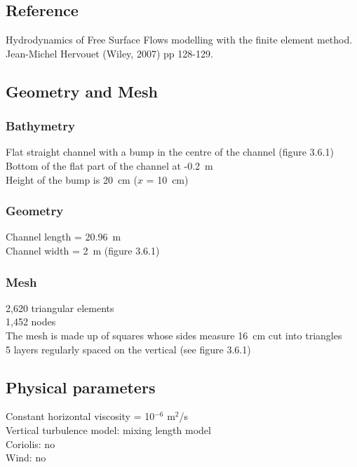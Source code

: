 \subsection{Reference}
%
Hydrodynamics of Free Surface Flows modelling with the finite element
method. Jean-Michel Hervouet (Wiley, 2007) pp 128-129.
%
%
%
\subsection{Geometry and Mesh}
%
\subsubsection{Bathymetry}
%
Flat straight channel with a bump in the centre of the channel
(figure 3.6.1)\\
Bottom of the flat part of the channel at -0.2~m\\
Height of the bump is 20~cm ($x$ = 10~cm)
%
\subsubsection{Geometry}
%
Channel length = 20.96~m\\
Channel width = 2~m (figure 3.6.1)
%
\subsubsection{Mesh}
%
2,620 triangular elements\\
1,452 nodes\\
The mesh is made up of squares whose sides measure 16~cm cut into
triangles\\
5 layers regularly spaced on the vertical (see figure 3.6.1)
%
%
%
\subsection{Physical parameters}
%
Constant horizontal viscosity = 10$^{-6}$ m$^2$/s\\
Vertical turbulence model: mixing length model\\
Coriolis: no\\
Wind: no
%
%
%
%
%
%
